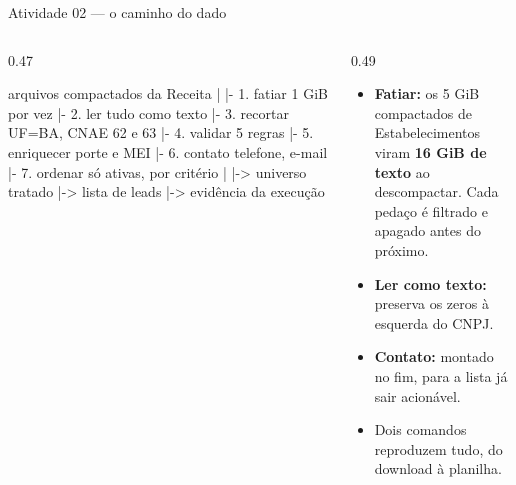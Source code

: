 \documentclass[aspectratio=169]{beamer}
\begin{document}
\begin{frame}[fragile]{Atividade 02 --- o caminho do dado}
    \begin{columns}[T]
        \begin{column}{0.47\textwidth}
\begin{semiverbatim}\footnotesize
arquivos compactados da Receita
 |
 |- 1. fatiar      1 GiB por vez
 |- 2. ler         tudo como texto
 |- 3. recortar    UF=BA, CNAE 62 e 63
 |- 4. validar     5 regras
 |- 5. enriquecer  porte e MEI
 |- 6. contato     telefone, e-mail
 |- 7. ordenar     só ativas, por critério
      |
      |-> universo tratado
      |-> lista de leads
      |-> evidência da execução
\end{semiverbatim}
        \end{column}
        \begin{column}{0.49\textwidth}
            \begin{itemize}
                \item \textbf{Fatiar:} os 5 GiB compactados de
                      Estabelecimentos viram \textbf{16 GiB de texto} ao
                      descompactar. Cada pedaço é filtrado e apagado antes do
                      próximo.
                \item \textbf{Ler como texto:} preserva os zeros à esquerda do
                      CNPJ.
                \item \textbf{Contato:} montado no fim, para a lista já sair
                      acionável.
                \item Dois comandos reproduzem tudo, do download à planilha.
            \end{itemize}
        \end{column}
    \end{columns}
\end{frame}
\end{document}

